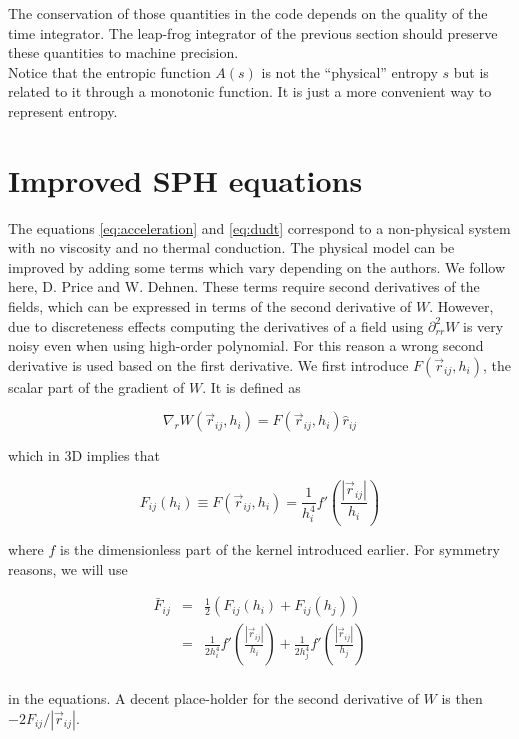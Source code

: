 \documentclass[a4paper,10pt]{article}
\begin{document}
The conservation of those quantities in the code depends on the quality of the time integrator. The leap-frog
integrator of the previous section should preserve these quantities to machine precision.\\
Notice that the entropic function $A(s)$ is not the ``physical'' entropy $s$ but is related to it through a monotonic
function. It is just a more convenient way to represent entropy.

\section{Improved SPH equations}

The equations \ref{eq:acceleration} and \ref{eq:dudt} correspond to a non-physical system with no viscosity and no
thermal conduction. The physical model can be improved by adding some terms which vary depending on the authors. We
follow here, D. Price and W. Dehnen.
These terms require second derivatives of the fields, which can be expressed in terms of the second derivative of $W$.
However, due to discreteness effects computing the derivatives of a field using $\partial^2_{rr}W$ is very noisy even
when using high-order polynomial. For this reason a wrong second derivative is used based on the first derivative. We
first introduce $F(\vec{r}_{ij},h_i)$, the scalar part of the gradient of $W$. It is defined as

\begin{equation}
 \nabla_r W(\vec{r}_{ij},h_i) = F(\vec{r}_{ij},h_i) \hat{r}_{ij}
\end{equation}

which in 3D implies that

\begin{equation}
 F_{ij}(h_i) \equiv F(\vec{r}_{ij},h_i) = \frac{1}{h_i^4}f'\left(\frac{|\vec{r}_{ij}|}{h_i}\right)
\end{equation}

where $f$ is the dimensionless part of the kernel introduced earlier. For symmetry reasons, we will use

\begin{eqnarray}
 \bar{F}_{ij} &=& \frac{1}{2} \left(F_{ij}(h_i) + F_{ij}(h_j)\right) \\
	      &=& \frac{1}{2h_i^4}f'\left(\frac{|\vec{r}_{ij}|}{h_i}\right) +
\frac{1}{2h_j^4}f'\left(\frac{|\vec{r}_{ij}|}{h_j}\right) \\
\end{eqnarray}

in the equations. A decent place-holder for the second derivative of $W$ is then $-2F_{ij}/|\vec{r}_{ij}|$.
\end{document}
